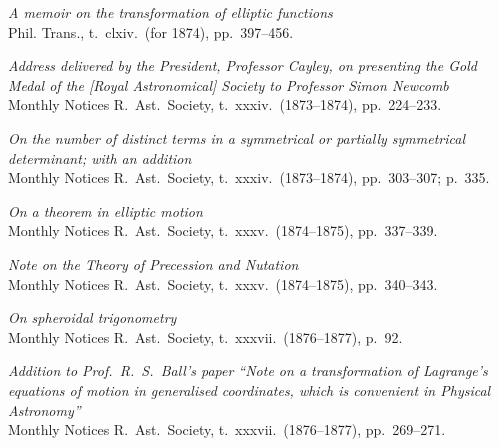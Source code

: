 \documentclass[11pt]{article}
\begin{document}
\begin{description}\itemsep=2pt
\item[578.] \textit{A memoir on the transformation of elliptic functions}\\
\hspace*{1em}\small Phil. Trans., t.~clxiv.\ (for 1874), pp.~397--456.

\item[579.] \textit{Address delivered by the President, Professor Cayley, on presenting the Gold Medal of the [Royal Astronomical] Society to Professor Simon Newcomb}\\
\hspace*{1em}\small Monthly Notices R.~Ast.\ Society, t.~xxxiv.\ (1873--1874), pp.~224--233.

\item[580.] \textit{On the number of distinct terms in a symmetrical or partially symmetrical determinant; with an addition}\\
\hspace*{1em}\small Monthly Notices R.~Ast.\ Society, t.~xxxiv.\ (1873--1874), pp.~303--307; p.~335.

\item[581.] \textit{On a theorem in elliptic motion}\\
\hspace*{1em}\small Monthly Notices R.~Ast.\ Society, t.~xxxv.\ (1874--1875), pp.~337--339.

\item[582.] \textit{Note on the Theory of Precession and Nutation}\\
\hspace*{1em}\small Monthly Notices R.~Ast.\ Society, t.~xxxv.\ (1874--1875), pp.~340--343.

\item[583.] \textit{On spheroidal trigonometry}\\
\hspace*{1em}\small Monthly Notices R.~Ast.\ Society, t.~xxxvii.\ (1876--1877), p.~92.

\item[584.] \textit{Addition to Prof.\ R.~S.\ Ball's paper ``Note on a transformation of Lagrange's equations of motion in generalised coordinates, which is convenient in Physical Astronomy''}\\
\hspace*{1em}\small Monthly Notices R.~Ast.\ Society, t.~xxxvii.\ (1876--1877), pp.~269--271.


\end{description}
\end{document}
